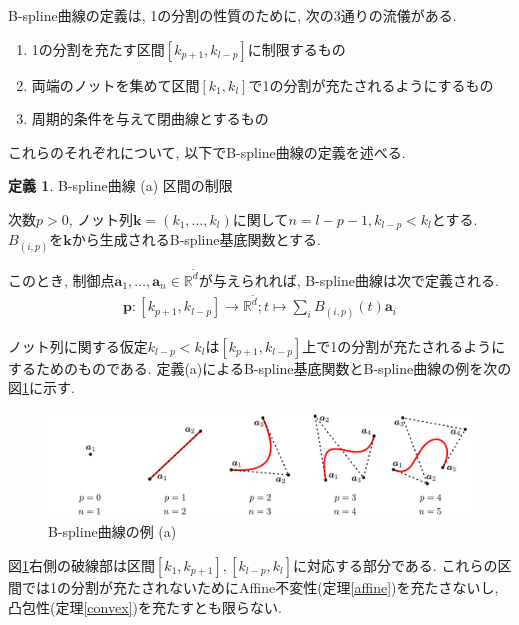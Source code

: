 \documentclass{jsarticle}
\newcommand\setR{\mathbb{R}}
\theoremstyle{definition}%
\newtheorem{defn}[thm]{定義}
\begin{document}
\newpage

B-spline曲線の定義は, 1の分割の性質のために, 次の3通りの流儀がある.
\begin{enumerate}
    \renewcommand{\labelenumi}{(\alph{enumi})}
    \item 1の分割を充たす区間$[k_{p+1},k_{l-p}]$に制限するもの
    \item 両端のノットを集めて区間$[k_1,k_l]$で1の分割が充たされるようにするもの
    \item 周期的条件を与えて閉曲線とするもの
\end{enumerate}
これらのそれぞれについて, 以下でB-spline曲線の定義を述べる.

\begin{screen}
	\begin{defn}
        \label{Def300a}
		B-spline曲線 (a) 区間の制限

        次数$p>0$, ノット列$\bm{k}=(k_1,\dots,k_l)$に関して$n=l-p-1, k_{l-p}<k_{l}$とする.
		$B_{(i,p)}$を$\bm{k}$から生成されるB-spline基底関数とする.

        このとき, 制御点$\bm{a}_1, \dots, \bm{a}_n\in \setR^{\tilde{d}}$が与えられれば, B-spline曲線は次で定義される.
		\begin{align}
			\bm{p}:[k_{p+1},k_{l-p}]\to \setR^{\tilde{d}};t\mapsto\sum_i B_{(i,p)}(t) \bm{a}_i
		\end{align}
	\end{defn}
\end{screen}
ノット列に関する仮定$k_{l-p}<k_{l}$は$[k_{p+1},k_{l-p}]$上で1の分割が充たされるようにするためのものである.
定義(a)によるB-spline基底関数とB-spline曲線の例を次の図\ref{Fig300a}に示す.
\addtocounter{footnote}{-1}
\begin{figure}[H]
	\centering
    \includegraphics[page=15,clip,width=160mm]{fig.pdf}
	\caption{B-spline曲線の例 (a)\protect\footnotemark}
	\label{Fig300a}
\end{figure}
図\ref{Fig300a}右側の破線部は区間$[k_{1},k_{p+1}], [k_{l-p},k_{l}]$に対応する部分である.
これらの区間では1の分割が充たされないためにAffine不変性(定理\ref{affine})を充たさないし, 凸包性(定理\ref{convex})を充たすとも限らない.
\end{document}
